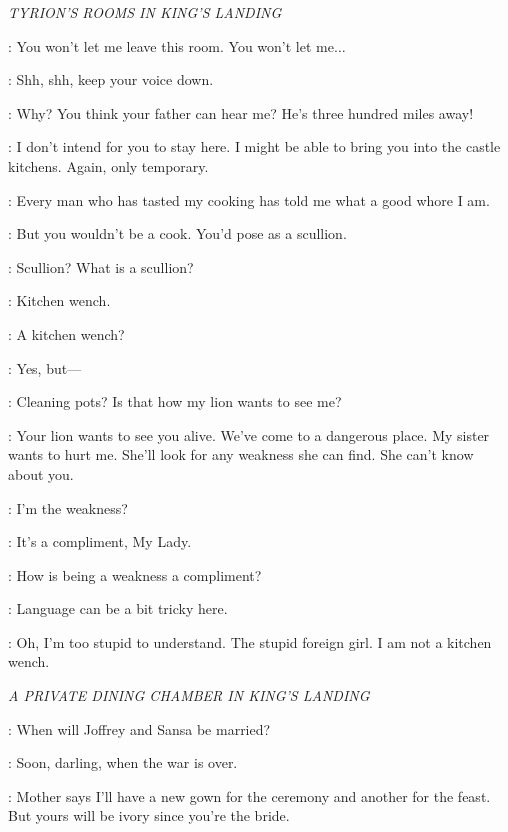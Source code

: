 \scene

\textit{TYRION'S ROOMS IN KING'S LANDING}


\SHAE: You won't let me leave this room. You won't let me$\ldots$  

\TYRION: Shh, shh, keep your voice down. 

\SHAE: Why? You think your father can hear me? He's three hundred miles away! 

\TYRION: I don't intend for you to stay here. I might be able to bring you into the castle kitchens. Again, only temporary. 

\SHAE: Every man who has tasted my cooking has told me what a good whore I am. 

\TYRION: But you wouldn't be a cook. You'd pose as a scullion. 

\SHAE: Scullion? What is a scullion? 

\TYRION: Kitchen wench. 

\SHAE: A kitchen wench? 

\TYRION: Yes, but--- 

\SHAE: Cleaning pots? Is that how my lion wants to see me? 

\TYRION: Your lion wants to see you alive. We've come to a dangerous place. My sister wants to hurt me. She'll look for any weakness she can find. She can't know about you. 

\SHAE: I'm the weakness? 

\TYRION: It's a compliment, My Lady. 

\SHAE: How is being a weakness a compliment? 

\TYRION: Language can be a bit tricky here. 

\SHAE: Oh, I'm too stupid to understand. The stupid foreign girl. I am not a kitchen wench. 


\scene

\textit{A PRIVATE DINING CHAMBER IN KING'S LANDING} 


\MYRCELLA: When will Joffrey and Sansa be married? 

\CERSEI: Soon, darling, when the war is over. 

\MYRCELLA: Mother says I'll have a new gown for the ceremony and another for the feast. But yours will be ivory since you're the bride. 


